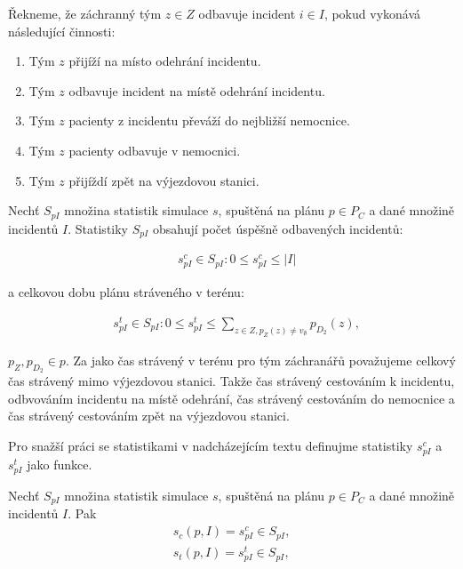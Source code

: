 \begin{definice}\label{df:odbavujeIncident}
  Řekneme, že záchranný tým $z \in Z$ odbavuje incident $i \in I$, pokud vykonává následující činnosti:
  \begin{enumerate}
    \item
      Tým $z$ přijíží na místo odehrání incidentu.

    \item
      Tým $z$ odbavuje incident na místě odehrání incidentu.

    \item
      Tým $z$ pacienty z incidentu převáží do nejbližší nemocnice.

    \item
      Tým $z$ pacienty odbavuje v nemocnici.

    \item
      Tým $z$ přijíždí zpět na výjezdovou stanici.
  \end{enumerate}
\end{definice}

\begin{definice}\label{df:statsSimul}
  Nechť $S_{pI}$ množina statistik simulace $s$, spuštěná na plánu $p \in P_C$ a dané množině incidentů $I$.
  Statistiky $S_{pI}$ obsahují počet úspěšně odbavených incidentů:

  \begin{align*}
    &s^{c}_{pI} \in S_{pI} \colon 0 \leq s^{c}_{pI} \leq |I|
  \end{align*}

  a celkovou dobu plánu stráveného v terénu:

  \begin{align*}
    &s^{t}_{pI} \in S_{pI} \colon 0 \leq s^{t}_{pI} \leq \sum_{z \in Z, p_Z(z) \neq v_{\emptyset}}{p_{D_2}(z)},
  \end{align*}

  $p_Z, p_{D_2} \in p$. Za jako čas strávený v terénu pro tým záchranářů považujeme celkový čas strávený mimo výjezdovou stanici.
  Takže čas strávený cestováním k incidentu, odbvováním incidentu na místě odehrání, čas strávený cestováním do nemocnice a čas strávený cestováním zpět na výjezdovou stanici.
\end{definice}

Pro snažší práci se statistikami v nadcházejícím textu definujme statistiky $s^c_{pI}$ a $s^t_{pI}$ jako funkce. 

\begin{definice}
  Nechť $S_{pI}$ množina statistik simulace $s$, spuštěná na plánu $p \in P_C$ a dané množině incidentů $I$.
  Pak
  \begin{align*}
    s_c(p, I) = s^c_{pI} \in S_{pI}, \\
    s_t(p, I) = s^t_{pI} \in S_{pI},
  \end{align*}
\end{definice}

